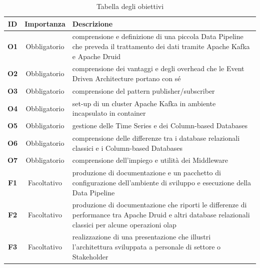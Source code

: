  \begin{table}[htbp]
    \centering
    \caption{Tabella degli obiettivi}    
    \label{tab:Tabella1}
    \begin{tabularx}{\textwidth}{|c|c|X|}
        \hline
        \textbf{ID} & \textbf{Importanza} & \textbf{Descrizione} \\\hline
        \textbf{O1} & Obbligatorio & comprensione e definizione di una piccola \gls{Data Pipeline}{}  che  preveda il trattamento dei dati
        tramite Apache Kafka e Apache Druid \\\hline
        \textbf{O2} & Obbligatorio & comprensione dei vantaggi e degli overhead  che le Event Driven Architecture portano con
        sé\\\hline
        \textbf{O3} & Obbligatorio & comprensione del pattern publisher/subscriber \\\hline
        \textbf{O4} & Obbligatorio & set-up di un cluster Apache Kafka in ambiente incapsulato in \gls{container}{} \\ \hline
        \textbf{O5} & Obbligatorio & gestione delle Time Series e dei Column-based Databases \\\hline
        \textbf{O6} & Obbligatorio & comprensione delle differenze tra i database relazionali  classici e i Column-based Databases\\\hline
        \textbf{O7} & Obbligatorio &comprensione dell’impiego e utilità dei \gls{Middleware}{} \\\hline
        \textbf{F1} & Facoltativo & produzione di documentazione e un pacchetto di configurazione  dell’ambiente di sviluppo e
        esecuzione  della \gls{Data Pipeline}{}\\\hline
        \textbf{F2} & Facoltativo & produzione di documentazione che riporti  le differenze  di performance  tra Apache Druid e altri
         database relazionali classici per alcune  operazioni \gls{olap}{} \\\hline
        \textbf{F3} & Facoltativo & realizzazione di una presentazione che illustri l’architettura  sviluppata  a personale di settore o
        Stakeholder \\\hline
    \end{tabularx} 

\end{table}
\pagebreak
\pagebreak
